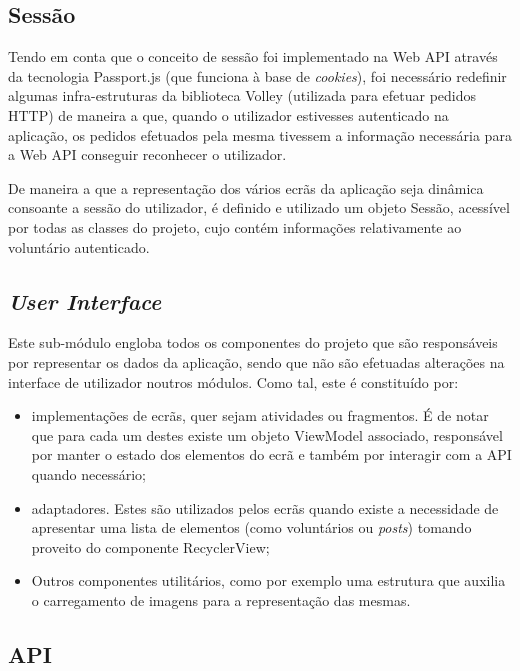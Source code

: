 \subsection{Sessão}

Tendo em conta que o conceito de sessão foi implementado na Web API através da tecnologia Passport.js (que funciona à base de \textit{cookies}), foi necessário redefinir algumas infra-estruturas da biblioteca Volley (utilizada para efetuar pedidos HTTP) de maneira a que, quando o utilizador estivesses autenticado na aplicação, os pedidos efetuados pela mesma tivessem a informação necessária para a Web API conseguir reconhecer o utilizador.

\medskip

De maneira a que a representação dos vários ecrãs da aplicação seja dinâmica consoante a sessão do utilizador, é definido e utilizado um objeto Sessão, acessível por todas as classes do projeto, cujo contém informações relativamente ao voluntário autenticado.

\subsection{\textit{User Interface}}

Este sub-módulo engloba todos os componentes do projeto que são responsáveis por representar os dados da aplicação, sendo que não são efetuadas alterações na interface de utilizador noutros módulos. Como tal, este é constituído por:

\begin{itemize}
	\item implementações de ecrãs, quer sejam atividades ou fragmentos. É de notar que para cada um destes existe um objeto ViewModel associado, responsável por manter o estado dos elementos do ecrã e também por interagir com a API quando necessário; 
	\item adaptadores. Estes são utilizados pelos ecrãs quando existe a necessidade de apresentar uma lista de elementos (como voluntários ou \textit{posts}) tomando proveito do componente RecyclerView;
	\item Outros componentes utilitários, como por exemplo uma estrutura que auxilia o carregamento de imagens para a representação das mesmas.
\end{itemize} 

\subsection{API}

